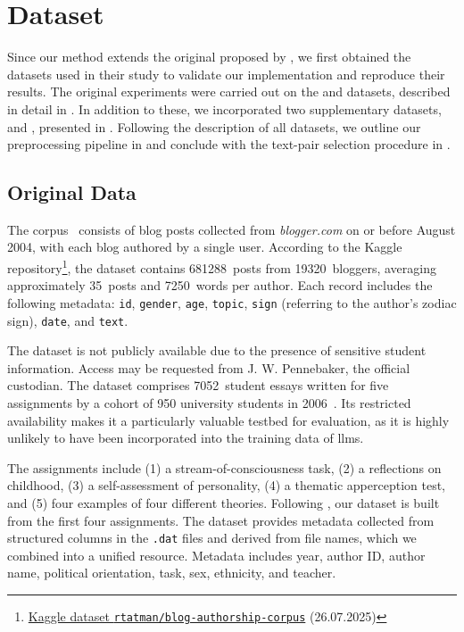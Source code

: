 \section{Dataset}
\label{sec:dataset}

Since our method extends the original \impAppr{} proposed by \citet{koppel_determining_2014}, we first obtained the datasets used in their study to validate our implementation and reproduce their results. 
The original experiments were carried out on the \dataBlog{} and \dataStudent{} datasets, described in detail in .
In addition to these, we incorporated two supplementary datasets, \dataPan{} and \dataGutenberg{}, presented in . 
Following the description of all datasets, we outline our preprocessing pipeline in  and conclude with the text-pair selection procedure in .


\subsection{Original Data}
\label{subsec:original_data}

The \dataBlog{} corpus~\citep{blog_dataset_2006} consists of blog posts collected from \textit{blogger.com} on or before August 2004, with each blog authored by a single user.
According to the Kaggle repository\footnote{\href{https://www.kaggle.com/datasets/rtatman/blog-authorship-corpus?resource=download}{Kaggle dataset \texttt{rtatman/blog-authorship-corpus}} (26.07.2025)}, the dataset contains \num{681288}~posts from \num{19320}~bloggers, averaging approximately 35~posts and \num{7250}~words per author.
Each record includes the following metadata: \texttt{id}, \texttt{gender}, \texttt{age}, \texttt{topic}, 
\texttt{sign} (referring to the author's zodiac sign), \texttt{date}, and \texttt{text}.

The \dataStudent{} dataset is not publicly available due to the presence of sensitive student information. 
Access may be requested from J. W. Pennebaker, the official custodian.
The dataset comprises \num{7052}~student essays written for five assignments by a cohort of 950 university students in 2006~\citep{koppel_determining_2014}.
Its restricted availability makes it a particularly valuable testbed for evaluation, as it is highly unlikely to have been incorporated into the training data of \acp{llm}.

The \dataStudent{} assignments include (1) a stream-of-consciousness task, (2) a reflections on childhood, (3) a self-assessment of personality, (4) a thematic apperception test, and (5) four examples of four different theories.
Following \citet{koppel_determining_2014}, our dataset is built from the first four assignments. 
The dataset provides metadata collected from structured columns in the \texttt{.dat} files and derived from file names, which we combined into a unified resource. 
Metadata includes year, author ID, author name, political orientation, task, sex, ethnicity, and teacher.


